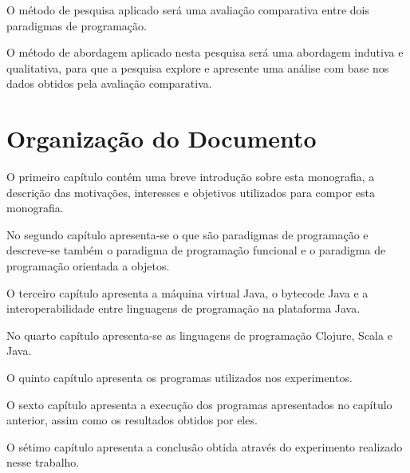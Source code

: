   O método de pesquisa aplicado será uma avaliação comparativa entre dois paradigmas de programação.

  O método de abordagem aplicado nesta pesquisa será uma abordagem indutiva e qualitativa, para que a pesquisa explore e apresente uma análise com base nos dados obtidos pela avaliação comparativa.

\section{Organização do Documento}

  O primeiro capítulo contém uma breve introdução sobre esta monografia, a descrição das motivações, interesses e objetivos utilizados para compor esta monografia.

  No segundo capítulo apresenta-se o que são paradigmas de programação e descreve-se também o paradigma de programação funcional e o paradigma de programação orientada a objetos.

  O terceiro capítulo apresenta a máquina virtual Java, o bytecode Java e a interoperabilidade entre linguagens de programação na plataforma Java.

  No quarto capítulo apresenta-se as linguagens de programação Clojure, Scala e Java.

  O quinto capítulo apresenta os programas utilizados nos experimentos.

  O sexto capítulo apresenta a execução dos programas apresentados no capítulo anterior, assim como os resultados obtidos por eles.

  O sétimo capítulo apresenta a conclusão obtida através do experimento realizado nesse trabalho.
